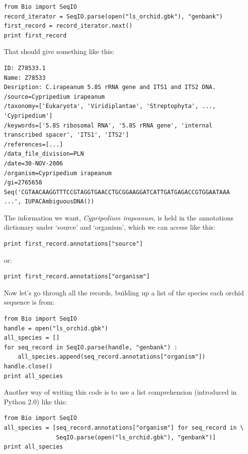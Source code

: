 \documentclass{report}
\begin{document}
\begin{verbatim}
from Bio import SeqIO
record_iterator = SeqIO.parse(open("ls_orchid.gbk"), "genbank")
first_record = record_iterator.next()
print first_record
\end{verbatim} 

\noindent That should give something like this:

\begin{verbatim}
ID: Z78533.1
Name: Z78533
Desription: C.irapeanum 5.8S rRNA gene and ITS1 and ITS2 DNA.
/source=Cypripedium irapeanum
/taxonomy=['Eukaryota', 'Viridiplantae', 'Streptophyta', ..., 'Cypripedium']
/keywords=['5.8S ribosomal RNA', '5.8S rRNA gene', 'internal transcribed spacer', 'ITS1', 'ITS2']
/references=[...]
/data_file_division=PLN
/date=30-NOV-2006
/organism=Cypripedium irapeanum
/gi=2765658
Seq('CGTAACAAGGTTTCCGTAGGTGAACCTGCGGAAGGATCATTGATGAGACCGTGGAATAAA ...', IUPACAmbiguousDNA())
\end{verbatim} 

\noindent The information we want, \emph{Cypripedium irapeanum}, is held in the annotations dictionary under `source' and `organism', which we can access like this:

\begin{verbatim}
print first_record.annotations["source"]
\end{verbatim} 

\noindent or:

\begin{verbatim}
print first_record.annotations["organism"]
\end{verbatim} 

Now let's go through all the records, building up a list of the species each orchid sequence is from:

\begin{verbatim}
from Bio import SeqIO
handle = open("ls_orchid.gbk")
all_species = []
for seq_record in SeqIO.parse(handle, "genbank") :
    all_species.append(seq_record.annotations["organism"])
handle.close()
print all_species
\end{verbatim} 

Another way of writing this code is to use a list comprehension (introduced in Python 2.0) like this:

\begin{verbatim}
from Bio import SeqIO
all_species = [seq_record.annotations["organism"] for seq_record in \
               SeqIO.parse(open("ls_orchid.gbk"), "genbank")]
print all_species
\end{verbatim}
\end{document}
